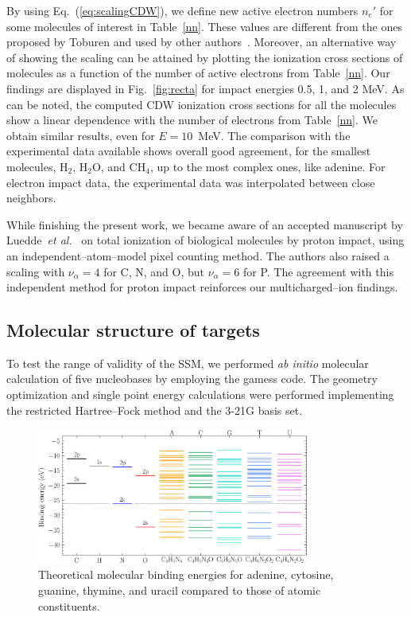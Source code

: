 \documentclass[10pt,showpacs,twocolumn]{revtex4}
\begin{document}
By using Eq.~(\ref{eq:scalingCDW}), we define new active electron 
numbers $n_e'$ for some molecules of interest in Table~\ref{nn}. These 
values are different from the ones proposed by Toburen and used by 
other authors~\cite{itoh2013}. Moreover, an alternative way of showing 
the scaling can be attained by plotting the ionization cross sections 
of molecules as a function of the number of active electrons from 
Table~\ref{nn}. Our findings are displayed in Fig.~\ref{fig:recta} for 
impact energies 0.5, 1, and 2 MeV. As can be noted, the computed CDW 
ionization cross sections for all the molecules show a linear 
dependence with the number of electrons from Table~\ref{nn}. We obtain 
similar results, even for $E=10$~MeV. The comparison with the 
experimental data available shows overall good agreement, for the 
smallest molecules, H$_2$, H$_2$O, and CH$_4$, up to the most complex 
ones, like adenine. For electron impact data, the experimental data was 
interpolated between close neighbors.

While finishing the present work, we became aware of an accepted manuscript by 
Luedde~{\it et al.}~\cite{luedde2019} on total ionization of biological
molecules by proton impact, using an independent--atom--model pixel counting
method. The authors also raised a scaling with $\nu_{\alpha}=4$ 
for C, N, and O, but $\nu_{\alpha}=6$ for P. The agreement with this 
independent method for proton impact reinforces our multicharged--ion findings.

\subsection{Molecular structure of targets}
\label{subsec:molcalculations}

To test the range of validity of the SSM, we performed {\it ab initio}
molecular calculation of five nucleobases by employing the {\sc gamess} 
code. The geometry optimization and single point energy calculations 
were performed implementing the restricted Hartree--Fock method and the 
3-21G basis set. 

\begin{figure}[t]
\centering
\includegraphics[width=0.8\textwidth]{levelsDNA.eps}
\caption{Theoretical molecular binding energies for adenine, cytosine, 
guanine, thymine, and uracil compared to those of atomic constituents.}
\label{fig:bindener}
\end{figure}
\end{document}
